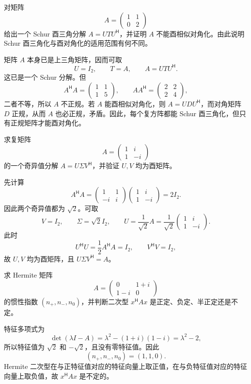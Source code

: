 \begin{exercise}[level=advanced]
对矩阵
\[
A=\begin{pmatrix}1&1\\0&2\end{pmatrix}
\]
给出一个 Schur 酉三角分解 $A=UTU^{\mathsf H}$，并证明 $A$ 不能酉相似对角化。由此说明 Schur 酉三角化与酉对角化的适用范围有何不同。
\begin{solution}
矩阵 $A$ 本身已是上三角矩阵，因而可取
\[
U=I_2,
\qquad
T=A,
\qquad
A=UTU^{\mathsf H}.
\]
这已是一个 Schur 分解。但
\[
A^{\mathsf H}A
=\begin{pmatrix}1&1\\1&5\end{pmatrix},
\qquad
AA^{\mathsf H}
=\begin{pmatrix}2&2\\2&4\end{pmatrix},
\]
二者不等，所以 $A$ 不正规。若 $A$ 能酉相似对角化，则 $A=UDU^{\mathsf H}$，而对角矩阵 $D$ 正规，从而 $A$ 也必正规，矛盾。因此，每个复方阵都能 Schur 酉三角化，但只有正规矩阵才能酉对角化。
\end{solution}
\end{exercise}

\begin{exercise}[level=advanced]
求复矩阵
\[
A=\begin{pmatrix}1&i\\1&-i\end{pmatrix}
\]
的一个奇异值分解 $A=U\Sigma V^{\mathsf H}$，并验证 $U,V$ 均为酉矩阵。
\begin{solution}
先计算
\[
A^{\mathsf H}A
=\begin{pmatrix}1&1\\-i&i\end{pmatrix}
\begin{pmatrix}1&i\\1&-i\end{pmatrix}
=2I_2.
\]
因此两个奇异值都为 $\sqrt2$。可取
\[
V=I_2,
\qquad
\Sigma=\sqrt2 I_2,
\qquad
U=\frac1{\sqrt2}A
=\frac1{\sqrt2}\begin{pmatrix}1&i\\1&-i\end{pmatrix}.
\]
此时
\[
U^{\mathsf H}U=\frac12A^{\mathsf H}A=I_2,
\qquad
V^{\mathsf H}V=I_2,
\]
故 $U,V$ 均为酉矩阵，且
$U\Sigma V^{\mathsf H}=A$。
\end{solution}
\end{exercise}

\begin{exercise}[level=advanced]
求 Hermite 矩阵
\[
A=\begin{pmatrix}0&1+i\\1-i&0\end{pmatrix}
\]
的惯性指数 $(n_+,n_-,n_0)$，并判断二次型 $x^{\mathsf H}Ax$ 是正定、负定、半正定还是不定。
\begin{solution}
特征多项式为
\[
\det(\lambda I-A)
=\lambda^2-(1+i)(1-i)
=\lambda^2-2,
\]
所以特征值为 $\sqrt2$ 和 $-\sqrt2$，且没有零特征值。因此
\[
(n_+,n_-,n_0)=(1,1,0).
\]
Hermite 二次型在与正特征值对应的特征向量上取正值，在与负特征值对应的特征向量上取负值，故 $x^{\mathsf H}Ax$ 是不定的。
\end{solution}
\end{exercise}

